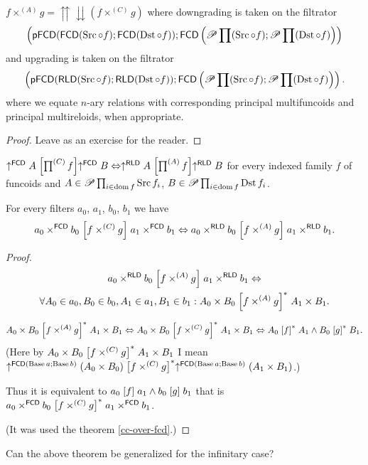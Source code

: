 \begin{cor}
$f\times^{(A)}g=\upuparrows\downdownarrows(f\times^{(C)}g)$ where
downgrading is taken on the filtrator 
\[
\left(\mathsf{pFCD}(\mathsf{FCD}(\operatorname{Src}\circ f);\mathsf{FCD}(\operatorname{Dst}\circ f));\mathsf{FCD}\left(\mathscr{P}\prod(\operatorname{Src}\circ f);\mathscr{P}\prod(\operatorname{Dst}\circ f)\right)\right)
\]
and upgrading is taken on the filtrator 
\[
\left(\mathsf{pFCD}(\mathsf{RLD}(\operatorname{Src}\circ f);\mathsf{RLD}(\operatorname{Dst}\circ f));\mathsf{FCD}\left(\mathscr{P}\prod(\operatorname{Src}\circ f);\mathscr{P}\prod(\operatorname{Dst}\circ f)\right)\right).
\]
where we equate $n$-ary relations with corresponding principal multifuncoids
and principal multireloids, when appropriate.\end{cor}
\begin{proof}
Leave as an exercise for the reader.\end{proof}
\begin{conjecture}
$\uparrow^{\mathsf{FCD}}A\mathrel{\left[\prod^{(C)}f\right]}\uparrow^{\mathsf{FCD}}B\Leftrightarrow\uparrow^{\mathsf{RLD}}A\mathrel{\left[\prod^{(A)}f\right]}\uparrow^{\mathsf{RLD}}B$
for every indexed family $f$ of funcoids and $A\in\mathscr{P}\prod_{i\in\operatorname{dom} f}\operatorname{Src} f_{i}$,
$B\in\mathscr{P}\prod_{i\in\operatorname{dom} f}\operatorname{Dst} f_{i}$.\end{conjecture}
\begin{thm}
For every filters $a_{0}$, $a_{1}$, $b_{0}$, $b_{1}$ we have 
\[
a_{0}\times^{\mathsf{FCD}}b_{0}\mathrel{\left[f\times^{(C)}g\right]}a_{1}\times^{\mathsf{FCD}}b_{1}\Leftrightarrow a_{0}\times^{\mathsf{RLD}}b_{0}\mathrel{\left[f\times^{(A)}g\right]}a_{1}\times^{\mathsf{RLD}}b_{1}.
\]
\end{thm}
\begin{proof}
~
\begin{multline*}
a_{0}\times^{\mathsf{RLD}}b_{0}\mathrel{\left[f\times^{(A)}g\right]}a_{1}\times^{\mathsf{RLD}}b_{1}\Leftrightarrow\\
\forall A_{0}\in a_{0},B_{0}\in b_{0},A_{1}\in a_{1},B_{1}\in b_{1}:A_{0}\times B_{0}\mathrel{\left[f\times^{(A)}g\right]^{\ast}}A_{1}\times B_{1}.
\end{multline*}


\[
A_{0}\times B_{0}\mathrel{\left[f\times^{(A)}g\right]^{\ast}}A_{1}\times B_{1}\Leftrightarrow A_{0}\times B_{0}\mathrel{\left[f\times^{(C)}g\right]^{\ast}}A_{1}\times B_{1}\Leftrightarrow A_{0}\mathrel{\left[f\right]^{\ast}}A_{1}\land B_{0}\mathrel{\left[g\right]^{\ast}}B_{1}.
\]
(Here by $A_{0}\times B_{0}\mathrel{\left[f\times^{(C)}g\right]^{\ast}}A_{1}\times B_{1}$
I mean $\uparrow^{\mathsf{FCD}(\operatorname{Base} a;\operatorname{Base} b)}(A_{0}\times B_{0})\mathrel{\left[f\times^{(C)}g\right]^{\ast}}\uparrow^{\mathsf{FCD}(\operatorname{Base} a;\operatorname{Base} b)}(A_{1}\times B_{1})$.)

Thus it is equivalent to $a_{0}\mathrel{\left[f\right]}a_{1}\wedge b_{0}\mathrel{\left[g\right]}b_{1}$
that is $a_{0}\times^{\mathsf{FCD}}b_{0}\mathrel{\left[f\times^{(C)}g\right]^{\ast}}a_{1}\times^{\mathsf{FCD}}b_{1}$.

(It was used the theorem \ref{cc-over-fcd}.)
\end{proof}
Can the above theorem be generalized for the infinitary case?


